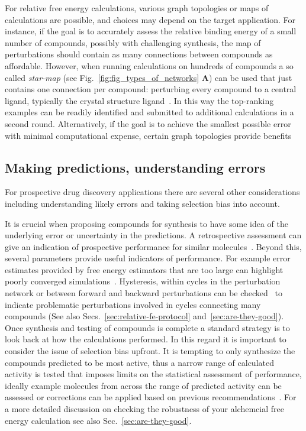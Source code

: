 \documentclass[9pt,bestpractices]{livecoms}
\begin{document}
For relative free energy calculations, various graph topologies or maps of calculations are possible, and choices may depend on the target application. For instance, if the goal is to accurately assess the relative binding energy of a small number of compounds, possibly with challenging synthesis, the map of perturbations should contain as many connections between compounds as affordable. However, when running calculations on hundreds of compounds a so called \emph{star-map} (see Fig.~\ref{fig:fig_types_of_networks} \textbf{A}) can be used that just contains one connection per compound: perturbing every compound to a central ligand, typically the crystal structure ligand~\cite{konze2019reactionbased}. In this way the top-ranking examples can be readily identified and submitted to additional calculations in a second round. Alternatively, if the goal is to achieve the smallest possible error with minimal computational expense, certain graph topologies provide benefits~\cite{yang2020optimal, xu2019optimal}


\subsection{Making predictions, understanding errors}
\label{subsec:predictions}
For prospective drug discovery applications there are several other considerations including understanding likely errors and taking selection bias into account. 

It is crucial when proposing compounds for synthesis to have some idea of the underlying error or uncertainty in the predictions. A retrospective assessment can give an indication of prospective performance for similar molecules~\cite{ciordia2016application}. Beyond this, several parameters provide useful indicators of performance. For example error estimates provided by free energy estimators that are too large can highlight poorly converged simulations~\cite{perez-benito2019predicting}. Hysteresis, within cycles in the perturbation network or between forward and backward perturbations can be checked~\cite{wang2013modeling} to indicate problematic perturbations involved in cycles connecting many compounds (See also Secs.~\ref{sec:relative-fe-protocol} and~\ref{sec:are-they-good}). Once synthesis and testing of compounds is complete a standard strategy is to look back at how the calculations performed. In this regard it is important to consider the issue of selection bias upfront. It is tempting to only synthesize the compounds predicted to be most active, thus a narrow range of calculated activity is tested that imposes limits on the statistical assessment of performance, ideally example molecules from across the range of predicted activity can be assessed or corrections can be applied based on previous recommendations~\cite{abel2017critical}. For a more detailed discussion on checking the robustness of your alchemcial free energy calculation see also Sec.~\ref{sec:are-they-good}.
\end{document}
